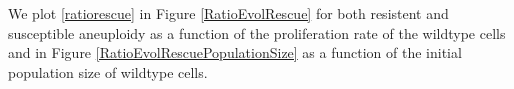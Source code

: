 \documentclass[12pt]{extarticle}
\begin{document}
We plot \eqref{ratiorescue} in Figure \ref{RatioEvolRescue} for both resistent and susceptible aneuploidy as a function of the proliferation rate of the wildtype cells and in Figure \ref{RatioEvolRescuePopulationSize} as a function of the initial population size of wildtype cells.
\end{document}
